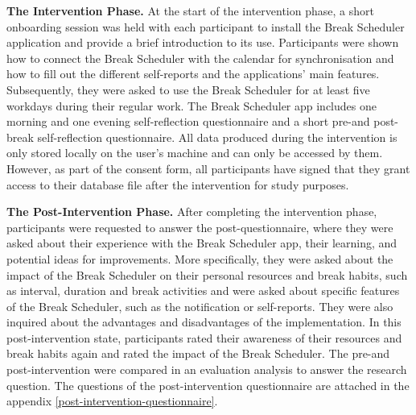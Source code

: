 \documentclass{hasel_thesis}
\begin{document}
\textbf{The Intervention Phase.} At the start of the intervention phase, a short onboarding session was held with each participant to install the Break Scheduler application and provide a brief introduction to its use. Participants were shown how to connect the Break Scheduler with the calendar for synchronisation and how to fill out the different self-reports and the applications' main features. Subsequently, they were asked to use the Break Scheduler for at least five workdays during their regular work. The Break Scheduler app includes one morning and one evening self-reflection questionnaire and a short pre-and post-break self-reflection questionnaire. All data produced during the intervention is only stored locally on the user's machine and can only be accessed by them. However, as part of the consent form, all participants have signed that they grant access to their database file after the intervention for study purposes.

\textbf{The Post-Intervention Phase.} After completing the intervention phase, participants were requested to answer the post-questionnaire, where they were asked about their experience with the Break Scheduler app, their learning, and potential ideas for improvements. More specifically, they were asked about the impact of the Break Scheduler on their personal resources and break habits, such as interval, duration and break activities and were asked about specific features of the Break Scheduler, such as the notification or self-reports. They were also inquired about the advantages and disadvantages of the implementation. In this post-intervention state, participants rated their awareness of their resources and break habits again and rated the impact of the Break Scheduler. The pre-and post-intervention were compared in an evaluation analysis to answer the research question. The questions of the post-intervention questionnaire are attached in the appendix \ref{post-intervention-questionnaire}.
\end{document}
